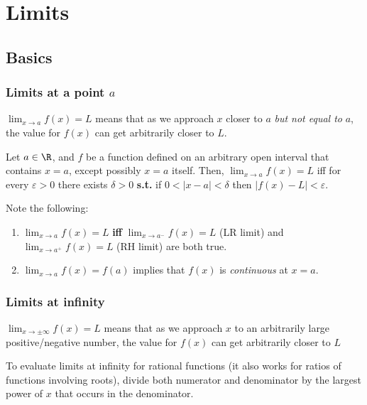 \documentclass[main.tex]{subfiles}
\begin{document}
\section{Limits}
\begin{multicols}{2} \raggedcolumns \setcounter{unbalance}{10}
	\subsection*{Basics}
	\subsubsection*{Limits at a point \(a\)}
	\begin{definition}[informal]
		\(\lim_{x \to a}{f(x)} = L\) means that as we approach \(x\) closer to \(a\) \emph{but not equal to} \(a\), 
		the value for \(f(x)\) can get arbitrarily closer to \(L\).
	\end{definition} 

	\begin{definition}[formal]
		Let \(a \in \R\), and \(f\) be a function defined on an arbitrary open interval that contains \(x = a\), except possibly \(x = a\) itself.
		Then, \(\lim_{x \to a}{f(x)} = L\) iff for every \(\varepsilon > 0\) there exists \(\delta > 0\) \textbf{s.t.} if \(0 < |x - a| < \delta\) then \( |f(x) - L| < \varepsilon\).
	\end{definition}

	Note the following:
	\begin{enumerate}
	\item \(\lim_{x \to a}{f(x)} = L\) \textbf{iff} \(\lim_{x \to a^{-}}{f(x)} = L\) (LR limit) 
	and \(\lim_{x \to a^{+}}{f(x)} = L\) (RH limit) are both true.
	\item \(\lim_{x \to a}{f(x)} = f(a)\) implies that \(f(x)\) is \emph{continuous} at \(x = a\).
	\end{enumerate}

	\subsubsection*{Limits at infinity}
	\begin{definition}[informal]
		\(\lim_{x \to \pm \infty}{f(x)} = L\) means that as we approach \(x\) to an arbitrarily large positive/negative number, the value for \(f(x)\) can get arbitrarily closer to \(L\)
	\end{definition}

	\begin{note}
	To evaluate limits at infinity for rational functions (it also works for ratios of functions involving roots), divide both numerator and denominator by the largest power of \(x\) that occurs in the denominator.
	\end{note}


\end{multicols}
\end{document}
